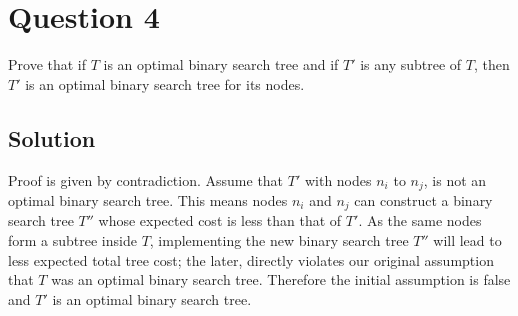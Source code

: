 
\section*{Question 4}

Prove that if $T$ is an optimal binary search tree and if $T'$ is any subtree of $T$, then $T'$ is an optimal binary search tree for its nodes.

\subsection*{Solution}

Proof is given by contradiction.
Assume that $T'$ with nodes $n_i$ to $n_j$, is not an optimal binary search tree.
This means nodes $n_i$ and $n_j$ can construct a binary search tree $T''$ whose expected cost is less than that of $T'$.
As the same nodes form a subtree inside $T$, implementing the new binary search tree $T''$ will lead to less expected total tree cost; the later, directly violates our original assumption that $T$ was an optimal binary search tree.
Therefore the initial assumption is false and $T'$ is an optimal binary search tree.
